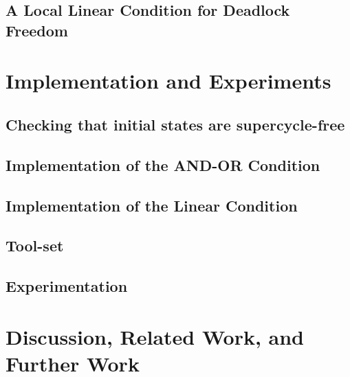 \documentclass[11pt]{article}
\begin{document}
   \subsection{A Local Linear Condition for Deadlock Freedom}
   \label{s:condition}
   


\section{Implementation and Experiments}
\label{s:impl}

   \subsection{Checking that initial states are supercycle-free}
   \label{s:initSCFree}
   


   \subsection{Implementation of the AND-OR Condition}
   \label{s:implANDOR}
   

   \subsection{Implementation of the Linear Condition}
   \label{s:implLin}
   


   \subsection{Tool-set}
  \label{s:experiments}
   

   \subsection{Experimentation}
  \label{s:experiments}
   




\clearpage
\section{Discussion, Related Work, and Further Work}
\label{s:discussion}








%
%
\end{document}
